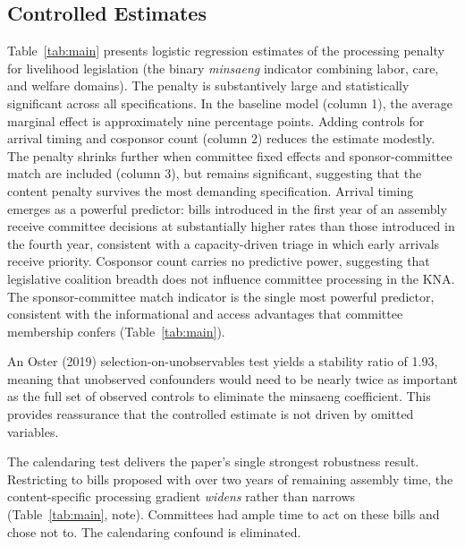 \documentclass[11pt]{article}
\begin{document}
\subsection{Controlled Estimates}

Table~\ref{tab:main} presents logistic regression estimates of the processing penalty for livelihood legislation (the binary \textit{minsaeng} indicator combining labor, care, and welfare domains). The penalty is substantively large and statistically significant across all specifications. In the baseline model (column 1), the average marginal effect is approximately nine percentage points. Adding controls for arrival timing and cosponsor count (column 2) reduces the estimate modestly. The penalty shrinks further when committee fixed effects and sponsor-committee match are included (column 3), but remains significant, suggesting that the content penalty survives the most demanding specification. Arrival timing emerges as a powerful predictor: bills introduced in the first year of an assembly receive committee decisions at substantially higher rates than those introduced in the fourth year, consistent with a capacity-driven triage in which early arrivals receive priority. Cosponsor count carries no predictive power, suggesting that legislative coalition breadth does not influence committee processing in the KNA. The sponsor-committee match indicator is the single most powerful predictor, consistent with the informational and access advantages that committee membership confers (Table~\ref{tab:main}).

An Oster (2019) selection-on-unobservables test yields a stability ratio of 1.93, meaning that unobserved confounders would need to be nearly twice as important as the full set of observed controls to eliminate the minsaeng coefficient. This provides reassurance that the controlled estimate is not driven by omitted variables.

The calendaring test delivers the paper's single strongest robustness result. Restricting to bills proposed with over two years of remaining assembly time, the content-specific processing gradient \textit{widens} rather than narrows (Table~\ref{tab:main}, note). Committees had ample time to act on these bills and chose not to. The calendaring confound is eliminated.
\end{document}
